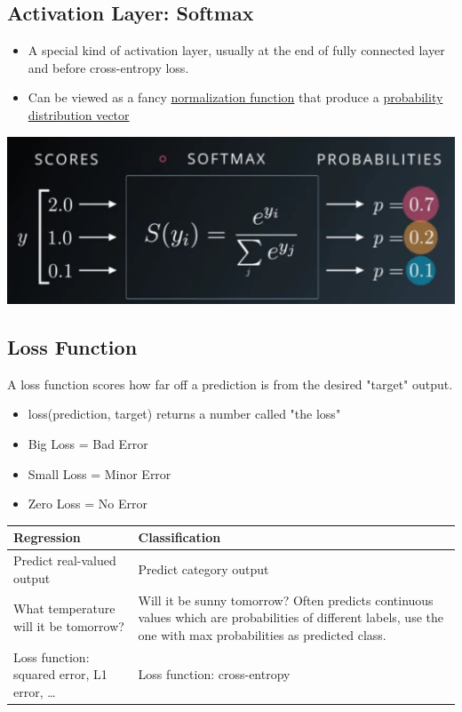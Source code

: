\documentclass[10pt]{article}
\begin{document}
\subsection*{Activation Layer: Softmax}
\begin{itemize}
	\item A special kind of activation layer, usually at the end of fully connected layer and before cross-entropy loss.
	\item Can be viewed as a fancy \underline{normalization function} that produce a \underline{probability distribution vector}
\end{itemize}
\begin{center} 
	\includegraphics*[width=\textwidth]{L2_23.png} 
\end{center}

\subsection*{Loss Function}
A loss function scores how far off a prediction is from the desired "target" output.
\begin{itemize}
	\item loss(prediction, target) returns a number called "the loss"
	\item Big Loss = Bad Error
	\item Small Loss = Minor Error
	\item Zero Loss = No Error
\end{itemize}

\begin{center}
\begin{tabularx}{\linewidth}{|X|X|}
    \hline \rule{0pt}{2.5ex}
    \textbf{Regression} & \textbf{Classification}\\
    \hline \rule{0pt}{2.5ex}
    Predict real-valued output & Predict category output\\
    \hline \rule{0pt}{2.5ex}
    What temperature will it be tomorrow? & Will it be sunny tomorrow?  Often predicts continuous values which are probabilities of different labels, use the one with max probabilities as predicted class.\\
    \hline \rule{0pt}{2.5ex}
    Loss function: squared error, L1 error, \dots & Loss function: cross-entropy\\
    \hline
\end{tabularx}
\end{center}
\end{document}
